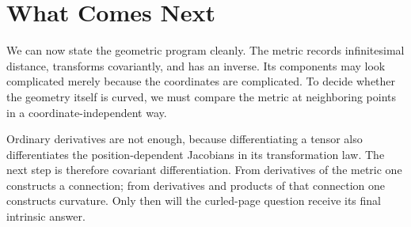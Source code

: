 \begin{classroomqa}
\end{classroomqa}

\section{What Comes Next}

We can now state the geometric program cleanly. The metric records
infinitesimal distance, transforms covariantly, and has an inverse. Its
components may look complicated merely because the coordinates are
complicated. To decide whether the geometry itself is curved, we must
compare the metric at neighboring points in a coordinate-independent
way.

Ordinary derivatives are not enough, because differentiating a tensor
also differentiates the position-dependent Jacobians in its
transformation law. The next step is therefore covariant
differentiation. From derivatives of the metric one constructs a
connection; from derivatives and products of that connection one
constructs curvature. Only then will the curled-page question receive
its final intrinsic answer.
